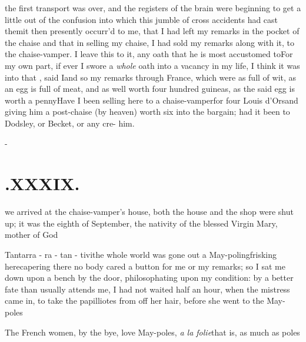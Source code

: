 \documentclass{article}
\begin{document}
 the first transport was over,
and the registers of the brain were beginning to get a little out
of the confusion into which this jumble of cross accidents had cast
them\tsk it then presently occurr’d to me, that I had left
my remarks in the pocket of the chaise\break
\tsk and that in selling my
chaise, I had sold my remarks along with it, to the chaise-vamper.
\hskip 78pt  I leave this \break to it, any oath that he is most accustomed
to\tsh For my own part, if ever I swore a \textit{whole}
oath into a vacancy in my life, I think it was into
that\tsh {}  , said I\tsk and so my
remarks through France, which were as full of wit, as an egg
is full of meat, and as well worth four hundred guineas, as the
said egg is worth a penny\tsk Have I been selling here to a
chaise-vamper\tsk for four Louis d’Ors\tsk and
giving him a post-chaise (by heaven) worth six into the bargain;
had it been to Dodsley, or Becket, or any
cre- 
him.

\vfill{}\eject
\null\kern-\baselineskip
\section{.\enspace XXXIX.}

 we arrived at the
chaise-vamper’s house, both the house and the shop were shut
up; it was the eighth of September, the nativity of the
blessed Virgin Mary, mother of God\tsh

\tsh Tantarra - ra - tan - tivi\tsh the whole world was gone out a
May-poling\break\tsk frisking here\tsk capering there\tsk
no\break
body cared a button for me or my remarks; so I sat me down upon
a bench by the door, philosophating upon my condition: by a
better fate than usually attends me, I had not waited half an
hour, when the mistress came in, to take the papilliotes from
off her hair, before she went to the May-poles\tsh

The French women, by the bye, love May-poles, \textit{a
la folie}\tsk that is, as much as
poles\tsh
\end{document}
